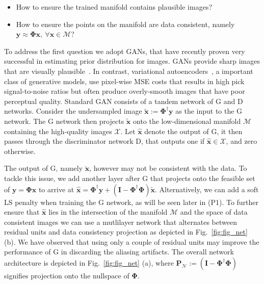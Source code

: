 \documentclass{journal}
\def \cN {\mathcal{N}}
\def \cS {\mathcal{S}}
\def \cM {\mathcal{M}}
\def \cX {\mathcal{X}}
\def \bPhi {\boldsymbol{\Phi}}
\def \by {\mathbf{y}}
\def \bx {\mathbf{x}}
\def \bI {\mathbf{I}}
\begin{document}
\begin{itemize}

\item How to ensure the trained manifold contains plausible images? 

\item How to ensure the points on the manifold are data consistent, namely $\by \approx \bPhi\bx, ~\forall \bx \in \cM$?



\end{itemize}
%
To address the first question we adopt GANs, that have recently proven very successful in estimating prior distribution for images. GANs provide sharp images that are visually plausible~\cite{gan-goodfellow2014}. In contrast, variational autoencoders~\cite{leding et al'16}, a important class of generative models, use pixel-wise MSE costs that results in high pick signal-to-noise ratios but often produce overly-smooth images that have poor perceptual quality. Standard GAN consists of a tandem network of G and D networks. Consider the undersampled image $\tilde{\bx}:=\bPhi^{\dagger}\by$ as the input to the G network. The G network then projects $\tilde{\bx}$ onto the low-dimensional manifold $\cM$ containing the high-quality images $\cX$. Let $\hat{\bx}$ denote the output of G, it then passes through the discriminator network D, that outputs one if $\hat{\bx} \in \cX$, and zero otherwise. 


The output of G, namely $\check{\bx}$, however may not be consistent with the data. To tackle this issue, we add another layer after G that projects onto the feasible set of $\by=\bPhi\bx$ to arrive at $\hat{\bx}=\bPhi^{\dagger} \by + (\bI-\bPhi^{\dagger}\bPhi) \check{\bx}$. Alternatively, we can add a soft LS penalty when training the G network, as will be seen later in (P1). To further ensure that $\hat{\bx}$ lies in the intersection of the manifold $\cM$ and the space of data consistent images we can use a mutlilayer network that alternates between residual units and data consistency projection as depicted in Fig.~\ref{fig:fig_net} (b). We have observed that using only a couple of residual units may improve the performance of G in discarding the aliasing artifacts. The overall network architecture is depicted in Fig.~\ref{fig:fig_net} (a), where $\mathbf{P}_{\cN}:=(\bI-\bPhi^{\dagger}\bPhi)$ signifies projection onto the nullspace of $\bPhi$. 
\end{document}
